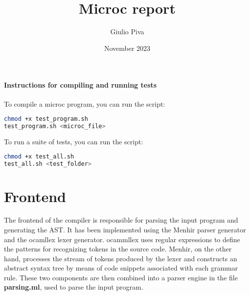 \documentclass{article}
\title{Microc report}
\author{Giulio Piva}
\date{November 2023}
\begin{document}
\maketitle

\paragraph{Instructions for compiling and running tests}
To compile a microc program, you can run the script:

\begin{lstlisting}[frame=single,language=bash, basicstyle=\ttfamily\fontsize{8pt}{14pt}]
chmod +x test_program.sh
test_program.sh <microc_file>
\end{lstlisting}
To run a suite of tests, you can run the script:
\begin{lstlisting}[frame=single, language=bash, basicstyle=\ttfamily\fontsize{8pt}{14pt}]
chmod +x test_all.sh
test_all.sh <test_folder>
\end{lstlisting}

\section{Frontend}
The frontend of the compiler is responsible for parsing the input program and generating the AST.
It has been implemented using the Menhir parser generator and the ocamllex lexer generator.
ocammllex uses regular expressions to define the patterns for recognizing tokens in the source code.
Menhir, on the other hand, processes the stream of tokens produced by the lexer and
constructs an abstract syntax tree by means of code snippets associated with each grammar rule.
These two components are then combined into a parser engine in the file \textbf{parsing.ml}, used to parse the input program.
\end{document}
